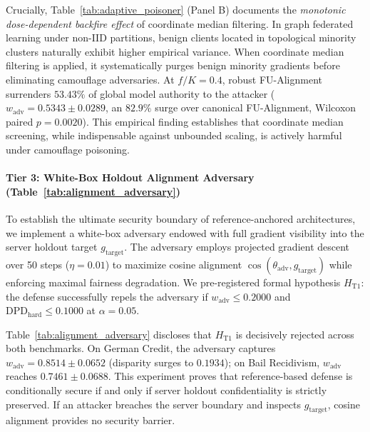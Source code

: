 Crucially, Table~\ref{tab:adaptive_poisoner} (Panel B) documents the \textit{monotonic dose-dependent backfire effect} of coordinate median filtering. In graph federated learning under non-IID partitions, benign clients located in topological minority clusters naturally exhibit higher empirical variance. When coordinate median filtering is applied, it systematically purges benign minority gradients before eliminating camouflage adversaries. At $f/K = 0.4$, robust FU-Alignment surrenders $53.43\%$ of global model authority to the attacker ($w_{\mathrm{adv}} = 0.5343 \pm 0.0289$, an $82.9\%$ surge over canonical FU-Alignment, Wilcoxon paired $p = 0.0020$). This empirical finding establishes that coordinate median screening, while indispensable against unbounded scaling, is actively harmful under camouflage poisoning.



\paragraph{Tier 3: White-Box Holdout Alignment Adversary (Table~\ref{tab:alignment_adversary})}
To establish the ultimate security boundary of reference-anchored architectures, we implement a white-box adversary endowed with full gradient visibility into the server holdout target $g_{\text{target}}$. The adversary employs projected gradient descent over 50 steps ($\eta = 0.01$) to maximize cosine alignment $\cos(\theta_{\text{adv}}, g_{\text{target}})$ while enforcing maximal fairness degradation. We pre-registered formal hypothesis $H_{\text{T1}}$: the defense successfully repels the adversary if $w_{\mathrm{adv}} \le 0.2000$ and $\text{DPD}_{\text{hard}} \le 0.1000$ at $\alpha = 0.05$.

Table~\ref{tab:alignment_adversary} discloses that $H_{\text{T1}}$ is decisively rejected across both benchmarks. On German Credit, the adversary captures $w_{\mathrm{adv}} = 0.8514 \pm 0.0652$ (disparity surges to $0.1934$); on Bail Recidivism, $w_{\mathrm{adv}}$ reaches $0.7461 \pm 0.0688$. This experiment proves that reference-based defense is conditionally secure if and only if server holdout confidentiality is strictly preserved. If an attacker breaches the server boundary and inspects $g_{\text{target}}$, cosine alignment provides no security barrier.




